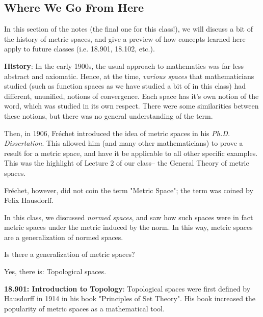 
\subsection*{Where We Go From Here}

In this section of the notes (the final one for this class!), we will discuss a bit of the history of metric spaces, and give a preview of how concepts learned here apply to future classes (i.e. 18.901, 18.102, etc.).

\textbf{History}: In the early 1900s, the usual approach to mathematics was far less abstract and axiomatic. Hence, at the time, \textit{various spaces} that mathematicians studied (such as function spaces as we have studied a bit of in this class) had different, ununified, notions of convergence. Each space has it's own notion of the word, which was studied in its own respect. There were some similarities between these notions, but there was no general understanding of the term. 

Then, in 1906, Fr\'echet introduced the idea of metric spaces in his \textit{Ph.D. Dissertation}. This allowed him (and many other mathematicians) to prove a result for a metric space, and have it be applicable to all other specific examples. This was the highlight of Lecture 2 of our class-- the General Theory of metric spaces.

\begin{remark}
Fr\'echet, however, did not coin the term "Metric Space"; the term was coined by Felix Hausdorff.
\end{remark}

In this class, we discussed \textit{normed spaces}, and saw how such spaces were in fact metric spaces under the metric induced by the norm. In this way, metric spaces are a generalization of normed spaces. 

\begin{question}
Is there a generalization of metric spaces?
\end{question}
Yes, there is: Topological spaces.

\textbf{18.901: Introduction to Topology}: Topological spaces were first defined by Hausdorff in 1914 in his book "Principles of Set Theory". His book increased the popularity of metric spaces as a mathematical tool. 

